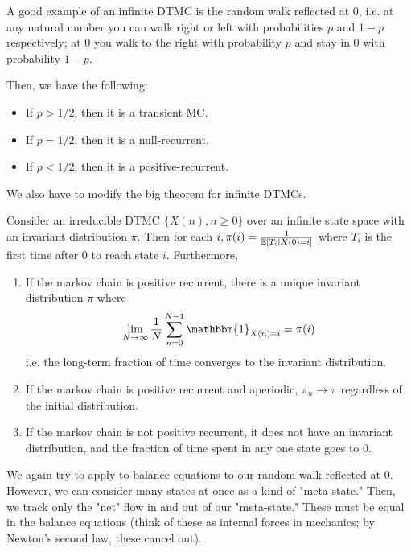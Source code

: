 A good example of an infinite DTMC is the random walk reflected at 0, i.e. at any natural number you can walk right or left with probabilities
$p$ and $1-p$ respectively; at 0 you walk
to the right with probability $p$ and stay in 0 with probability $1 - p$.

Then, we have the following:
\begin{itemize}
    \item If $p > 1/2$, then it is a transient MC.
    \item If $p = 1/2$, then it is a null-recurrent.
    \item If $p < 1/2$, then it is a positive-recurrent.
\end{itemize}

We also have to modify the big theorem for infinite DTMCs.

\begin{theorem}
    Consider an irreducible DTMC $\{X(n), n \geq 0\}$ over an infinite state space with an invariant
    distribution $\pi$. Then for each $i, \pi(i) = \frac{1}{\mathbb{E}\left[ T_i \mid X(0) = i \right]}$ where $T_i$ is
    the first time after 0 to reach state $i$. Furthermore,

    \begin{enumerate}
        \item If the markov chain is positive recurrent, there is a unique invariant distribution $\pi$ where
        \begin{align*}
            \lim_{N \to \infty} \frac{1}{N} \sum_{n = 0}^{N - 1} \mathbbm{1}_{X(n) = i} = \pi(i)
        \end{align*}
        i.e. the long-term fraction of time converges to the invariant distribution.
        \item If the markov chain is positive recurrent and aperiodic, $\pi_n \to \pi$ regardless of the initial distribution.
        \item If the markov chain is not positive recurrent, it does not have an invariant distribution, and the
        fraction of time spent in any one state goes to 0.
    \end{enumerate}
\end{theorem}

We again try to apply to balance equations to our random walk reflected at 0. However,
we can consider many states at once as a kind of "meta-state." Then, we track only the "net" flow in and out
of our "meta-state." These must be equal in the balance equations (think of these as internal forces in mechanics;
by Newton's second law, these cancel out).


